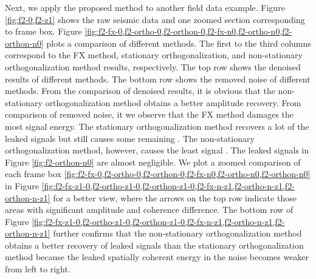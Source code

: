 Next, we apply the proposed method to another field data example. Figure \ref{fig:f2-0,f2-z1} shows the raw seismic data and one zoomed section corresponding to frame box. Figure \ref{fig:f2-fx-0,f2-ortho-0,f2-orthon-0,f2-fx-n0,f2-ortho-n0,f2-orthon-n0} plots a comparison of different methods. The first to the third columns correspond to the FX method, stationary orthogonalization, and non-stationary orthogonalization method results, respectively. The top row shows the denoised results of different methods. The bottom row shows the removed noise of different methods. From the comparison of denoised results, it is obvious that the non-stationary orthogonalization method obtains a better amplitude recovery. From comparison of removed noise, it we observe that the FX method damages the most signal energy. The stationary orthogonalization method recovers a lot of the leaked signals but still causes some remaining . The non-stationary orthogonalization method, however, causes the least signal . The leaked signals in Figure \ref{fig:f2-orthon-n0} are almost negligible. We plot a zoomed comparison of each frame box  \ref{fig:f2-fx-0,f2-ortho-0,f2-orthon-0,f2-fx-n0,f2-ortho-n0,f2-orthon-n0}  in Figure \ref{fig:f2-fx-z1-0,f2-ortho-z1-0,f2-orthon-z1-0,f2-fx-n-z1,f2-ortho-n-z1,f2-orthon-n-z1} for a better view, where the arrows on the top row indicate those areas with significant amplitude and coherence difference.  The bottom row of Figure \ref{fig:f2-fx-z1-0,f2-ortho-z1-0,f2-orthon-z1-0,f2-fx-n-z1,f2-ortho-n-z1,f2-orthon-n-z1} further confirms that the non-stationary orthogonalization method obtains a better recovery of leaked signals than the stationary orthogonalization method because the leaked spatially coherent energy in the noise becomes weaker from left to right.

